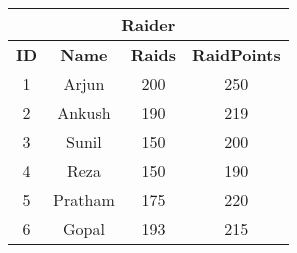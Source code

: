 \begin{tabular}{|c|c|c|c|}
    \hline
    \multicolumn{4}{|c|}{\textbf{Raider}} \\
    \hline
    \textbf{ID} & \textbf{Name} & \textbf{Raids} & \textbf{RaidPoints} \\
    \hline
    1 & Arjun & 200 & 250 \\
    2 & Ankush & 190 & 219 \\
    3 & Sunil & 150 & 200 \\
    4 & Reza & 150 & 190 \\
    5 & Pratham & 175 & 220 \\
    6 & Gopal & 193 & 215 \\
    \hline
\end{tabular}